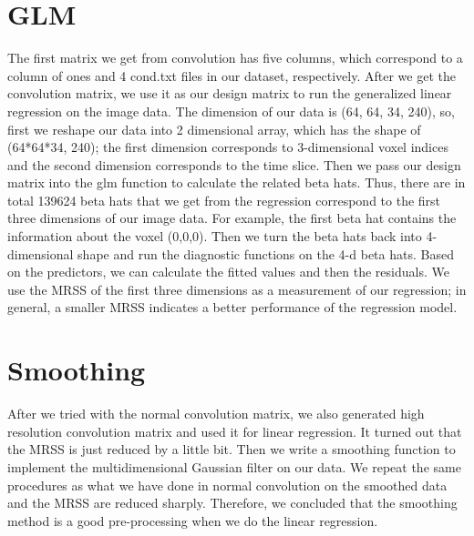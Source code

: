 \section {GLM}
The first matrix we get from convolution has five columns, which correspond to a column of ones and 4 cond.txt files in our dataset, respectively. After we get the convolution matrix, we use it as our design matrix to run the generalized linear regression on the image data. The dimension of our data is (64, 64, 34, 240), so, first we reshape our data into 2 dimensional array, which has the shape of (64*64*34, 240); the first dimension corresponds to 3-dimensional voxel indices and the second dimension corresponds to the time slice. Then we pass our design matrix into the glm function to calculate the related beta hats. Thus, there are in total 139624 beta hats that we get from the regression correspond to the first three dimensions of our image data. For example, the first beta hat contains the information about the voxel (0,0,0). Then we turn the beta hats back into 4-dimensional shape and run the diagnostic functions on the 4-d beta hats. Based on the predictors, we can calculate the fitted values and then the residuals. We use the MRSS of the first three dimensions as a measurement of our regression; in general, a smaller MRSS indicates a better performance of the regression model. 

\section {Smoothing} 
After we tried with the normal convolution matrix, we also generated high resolution convolution matrix and used it for linear regression. It turned out that the MRSS is just reduced by a little bit. Then we write a smoothing function to implement the multidimensional Gaussian filter on our data. We repeat the same procedures as what we have done in normal convolution on the smoothed data and the MRSS are reduced sharply. Therefore, we concluded that the smoothing method is a good pre-processing when we do the linear regression. 

